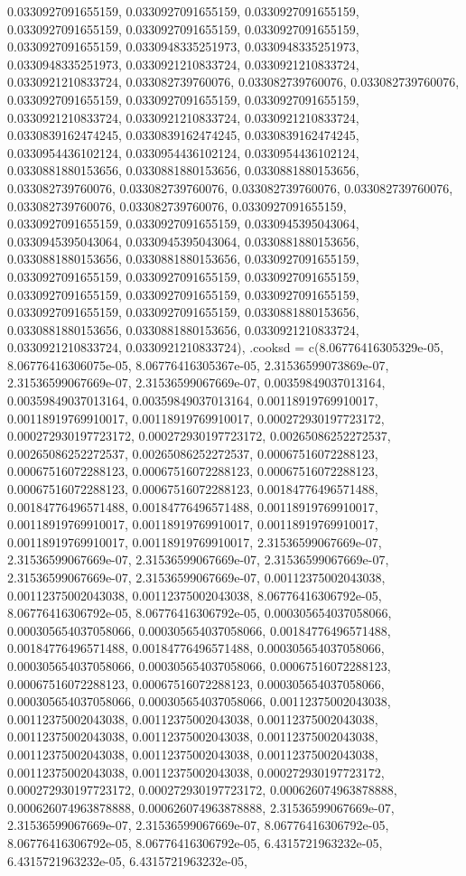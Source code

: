 \documentclass[
  ,man]{apa6}
\begin{document}
0.0330927091655159, 0.0330927091655159, 0.0330927091655159, 0.0330927091655159, 0.0330927091655159, 0.0330927091655159, 0.0330927091655159, 0.0330948335251973, 0.0330948335251973, 0.0330948335251973, 0.0330921210833724, 0.0330921210833724, 0.0330921210833724, 0.033082739760076, 0.033082739760076, 0.033082739760076, 0.0330927091655159, 0.0330927091655159, 0.0330927091655159, 0.0330921210833724, 0.0330921210833724, 0.0330921210833724, 0.0330839162474245, 0.0330839162474245, 0.0330839162474245, 0.0330954436102124,
0.0330954436102124, 0.0330954436102124, 0.0330881880153656, 0.0330881880153656, 0.0330881880153656, 0.033082739760076, 0.033082739760076, 0.033082739760076, 0.033082739760076, 0.033082739760076, 0.033082739760076, 0.0330927091655159, 0.0330927091655159, 0.0330927091655159, 0.0330945395043064, 0.0330945395043064, 0.0330945395043064, 0.0330881880153656, 0.0330881880153656, 0.0330881880153656, 0.0330927091655159, 0.0330927091655159, 0.0330927091655159, 0.0330927091655159, 0.0330927091655159, 0.0330927091655159,
0.0330927091655159, 0.0330927091655159, 0.0330927091655159, 0.0330881880153656, 0.0330881880153656, 0.0330881880153656, 0.0330921210833724, 0.0330921210833724, 0.0330921210833724), .cooksd = c(8.06776416305329e-05, 8.06776416306075e-05, 8.06776416305367e-05, 2.31536599073869e-07, 2.31536599067669e-07, 2.31536599067669e-07, 0.00359849037013164, 0.00359849037013164, 0.00359849037013164, 0.00118919769910017, 0.00118919769910017, 0.00118919769910017, 0.000272930197723172, 0.000272930197723172, 0.000272930197723172,
0.00265086252272537, 0.00265086252272537, 0.00265086252272537, 0.00067516072288123, 0.00067516072288123, 0.00067516072288123, 0.00067516072288123, 0.00067516072288123, 0.00067516072288123, 0.00184776496571488, 0.00184776496571488, 0.00184776496571488, 0.00118919769910017, 0.00118919769910017, 0.00118919769910017, 0.00118919769910017, 0.00118919769910017, 0.00118919769910017, 2.31536599067669e-07, 2.31536599067669e-07, 2.31536599067669e-07, 2.31536599067669e-07, 2.31536599067669e-07, 2.31536599067669e-07,
0.00112375002043038, 0.00112375002043038, 0.00112375002043038, 8.06776416306792e-05, 8.06776416306792e-05, 8.06776416306792e-05, 0.000305654037058066, 0.000305654037058066, 0.000305654037058066, 0.00184776496571488, 0.00184776496571488, 0.00184776496571488, 0.000305654037058066, 0.000305654037058066, 0.000305654037058066, 0.00067516072288123, 0.00067516072288123, 0.00067516072288123, 0.000305654037058066, 0.000305654037058066, 0.000305654037058066, 0.00112375002043038, 0.00112375002043038, 0.00112375002043038,
0.00112375002043038, 0.00112375002043038, 0.00112375002043038, 0.00112375002043038, 0.00112375002043038, 0.00112375002043038, 0.00112375002043038, 0.00112375002043038, 0.00112375002043038, 0.000272930197723172, 0.000272930197723172, 0.000272930197723172, 0.000626074963878888, 0.000626074963878888, 0.000626074963878888, 2.31536599067669e-07, 2.31536599067669e-07, 2.31536599067669e-07, 8.06776416306792e-05, 8.06776416306792e-05, 8.06776416306792e-05, 6.4315721963232e-05, 6.4315721963232e-05, 6.4315721963232e-05,
\end{document}
